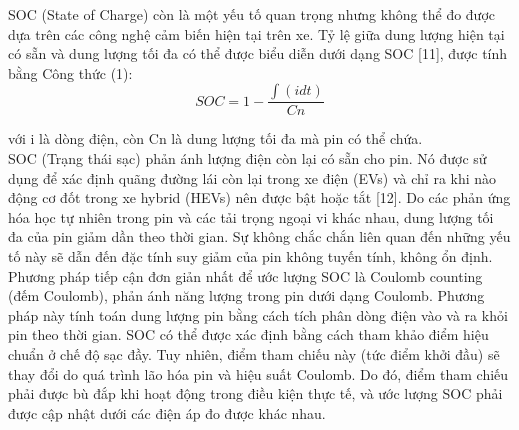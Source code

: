 \documentclass[a4paper,11pt]{article}
\theoremstyle{mytheor}
\begin{document}
SOC (State of Charge) còn là một yếu tố quan trọng nhưng không thể đo được dựa trên các công nghệ cảm biến hiện tại trên xe. Tỷ lệ giữa dung lượng hiện tại có sẵn và dung lượng tối đa có thể được biểu diễn dưới dạng SOC [11], được tính bằng Công thức (1):\\
\[SOC = 1 - \frac{\int(idt)}{Cn}\]

với i là dòng điện, còn Cn là dung lượng tối đa mà pin có thể chứa. \\

SOC (Trạng thái sạc) phản ánh lượng điện còn lại có sẵn cho pin. Nó được sử dụng để xác định quãng đường lái còn lại trong xe điện (EVs) và chỉ ra khi nào động cơ đốt trong xe hybrid (HEVs) nên được bật hoặc tắt [12]. Do các phản ứng hóa học tự nhiên trong pin và các tải trọng ngoại vi khác nhau, dung lượng tối đa của pin giảm dần theo thời gian. Sự không chắc chắn liên quan đến những yếu tố này sẽ dẫn đến đặc tính suy giảm của pin không tuyến tính, không ổn định. Phương pháp tiếp cận đơn giản nhất để ước lượng SOC là Coulomb counting (đếm Coulomb), phản ánh năng lượng trong pin dưới dạng Coulomb. Phương pháp này tính toán dung lượng pin bằng cách tích phân dòng điện vào và ra khỏi pin theo thời gian. SOC có thể được xác định bằng cách tham khảo điểm hiệu chuẩn ở chế độ sạc đầy. Tuy nhiên, điểm tham chiếu này (tức điểm khởi đầu) sẽ thay đổi do quá trình lão hóa pin và hiệu suất Coulomb. Do đó, điểm tham chiếu phải được bù đắp khi hoạt động trong điều kiện thực tế, và ước lượng SOC phải được cập nhật dưới các điện áp đo được khác nhau.
\end{document}
